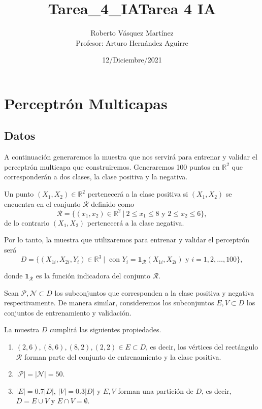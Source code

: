 \documentclass[11pt]{article}
\title{Tarea\_4\_IA}
\providecommand{\tightlist}{%
      \setlength{\itemsep}{0pt}\setlength{\parskip}{0pt}}
\begin{document}
    \title{Tarea 4 IA}
    \author{Roberto Vásquez Martínez \\ Profesor: Arturo Hernández Aguirre}
    \date{12/Diciembre/2021}
    \maketitle
    
    
    \hypertarget{perceptruxf3n-multicapas}{%
\section{Perceptrón Multicapas}\label{perceptruxf3n-multicapas}}

    \hypertarget{datos}{%
\subsection{Datos}\label{datos}}

    A continuación generaremos la muestra que nos servirá para entrenar y
validar el perceptrón multicapa que construiremos. Generaremos 100
puntos en \(\mathbb{R}^2\) que corresponderán a dos clases, la clase
positiva y la negativa.

Un punto \((X_1,X_2)\in\mathbb{R}^2\) pertenecerá a la clase positiva si
\((X_1,X_2)\) se encuentra en el conjunto \(\mathcal{R}\) definido como
\begin{equation*}
    \mathcal{R}=\{(x_1,x_2)\in\mathbb{R}^2\ |\ 2\leq x_1\leq 8\text{ y } 2\leq x_2\leq 6\},
\end{equation*} de lo contrario \((X_1,X_2)\) pertenecerá a la clase
negativa.

    Por lo tanto, la muestra que utilizaremos para entrenar y validar el
perceptrón será \begin{equation*}
    D=\{(X_{1i},X_{2i},Y_i)\in\mathbb{R}^3\ |\ \text{ con }Y_i=\mathbf{1}_{\mathcal{R}}(X_{1i},X_{2i})\text{ y }i=1,2,\dots,100\},
\end{equation*}

donde \(\mathbf{1}_{\mathcal{R}}\) es la función indicadora del conjunto
\(\mathcal{R}\).

Sean \(\mathcal{P},\mathcal{N}\subset D\) los subconjuntos que
corresponden a la clase positiva y negativa respectivamente. De manera
similar, consideremos los subconjuntos \(E,V\subset D\) los conjuntos de
entrenamiento y validación.

La muestra \(D\) cumplirá las siguientes propiedades.

\begin{enumerate}
\def\labelenumi{\arabic{enumi}.}
\tightlist
\item
  \((2,6),(8,6),(8,2),(2,2)\in E\subset D\), es decir, los vértices del
  rectángulo \(\mathcal{R}\) forman parte del conjunto de entrenamiento
  y la clase positiva.
\item
  \(|\mathcal{P}|=|\mathcal{N}|=50\).
\item
  \(|E|=0.7 |D|\), \(|V|=0.3 |D|\) y \(E,V\) forman una partición de
  \(D\), es decir, \(D=E\cup V\) y \(E\cap V=\emptyset\).
\end{enumerate}
\end{document}
